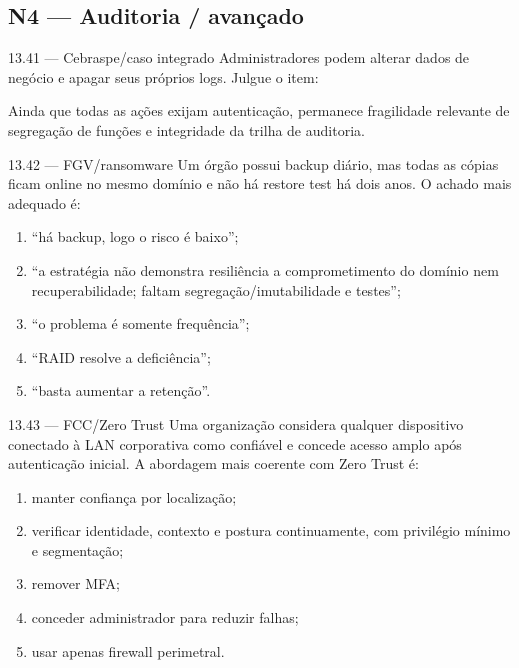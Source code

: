\subsection*{N4 — Auditoria / avançado}

\begin{questao}{ 13.41 — Cebraspe/caso integrado}
Administradores podem alterar dados de negócio e apagar seus próprios logs. Julgue o item:

Ainda que todas as ações exijam autenticação, permanece fragilidade relevante de segregação de funções e integridade da trilha de auditoria.
\end{questao}

\begin{questao}{ 13.42 — FGV/ransomware}
Um órgão possui backup diário, mas todas as cópias ficam online no mesmo domínio e não há restore test há dois anos. O achado mais adequado é:
\begin{enumerate}[label=\Alph*)]
\item ``há backup, logo o risco é baixo'';
\item ``a estratégia não demonstra resiliência a comprometimento do domínio nem recuperabilidade; faltam segregação/imutabilidade e testes'';
\item ``o problema é somente frequência'';
\item ``RAID resolve a deficiência'';
\item ``basta aumentar a retenção''.
\end{enumerate}
\end{questao}

\begin{questao}{ 13.43 — FCC/Zero Trust}
Uma organização considera qualquer dispositivo conectado à LAN corporativa como confiável e concede acesso amplo após autenticação inicial. A abordagem mais coerente com Zero Trust é:
\begin{enumerate}[label=\Alph*)]
\item manter confiança por localização;
\item verificar identidade, contexto e postura continuamente, com privilégio mínimo e segmentação;
\item remover MFA;
\item conceder administrador para reduzir falhas;
\item usar apenas firewall perimetral.
\end{enumerate}
\end{questao}


